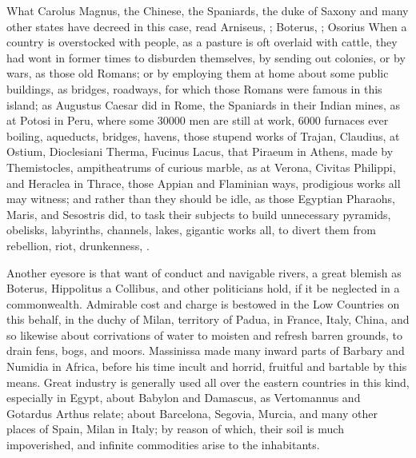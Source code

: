 What Carolus Magnus, the Chinese, the Spaniards, the duke of Saxony and many
other states have decreed in this case, read Arniseus,
; Boterus, ; Osorius  When a
country is overstocked with people, as a pasture is oft overlaid with cattle,
they had wont in former times to disburden themselves, by sending out colonies,
or by wars, as those old Romans; or by employing them at home about some public
buildings, as bridges, roadways, for which those Romans were famous in this
island; as Augustus Caesar did in Rome, the Spaniards in their Indian mines, as
at Potosi in Peru, where some 30\thinspace{}000 men are still at work, 6000
furnaces ever boiling, \etc{} aqueducts, bridges, havens,
those stupend works of Trajan, Claudius, at Ostium,
Dioclesiani Therma, Fucinus Lacus, that Piraeum in Athens, made by
Themistocles, ampitheatrums of curious marble, as at Verona, Civitas Philippi,
and Heraclea in Thrace, those Appian and Flaminian ways, prodigious works all
may witness; and rather than they should be idle, as those
Egyptian Pharaohs, Maris, and Sesostris did, to task their
subjects to build unnecessary pyramids, obelisks, labyrinths, channels, lakes,
gigantic works all, to divert them from rebellion, riot, drunkenness, .

Another eyesore is that want of conduct and navigable rivers, a great blemish
as Boterus, Hippolitus a Collibus, and
other politicians hold, if it be neglected in a commonwealth. Admirable cost
and charge is bestowed in the Low Countries on this behalf, in the duchy of
Milan, territory of Padua, in France, Italy, China, and so
likewise about corrivations of water to moisten and refresh barren grounds, to
drain fens, bogs, and moors. Massinissa made many inward parts of Barbary and
Numidia in Africa, before his time incult and horrid, fruitful and bartable by
this means. Great industry is generally used all over the eastern countries in
this kind, especially in Egypt, about Babylon and Damascus, as Vertomannus and
Gotardus Arthus relate; about Barcelona, Segovia, Murcia,
and many other places of Spain, Milan in Italy; by reason of which, their soil
is much impoverished, and infinite commodities arise to the inhabitants.

